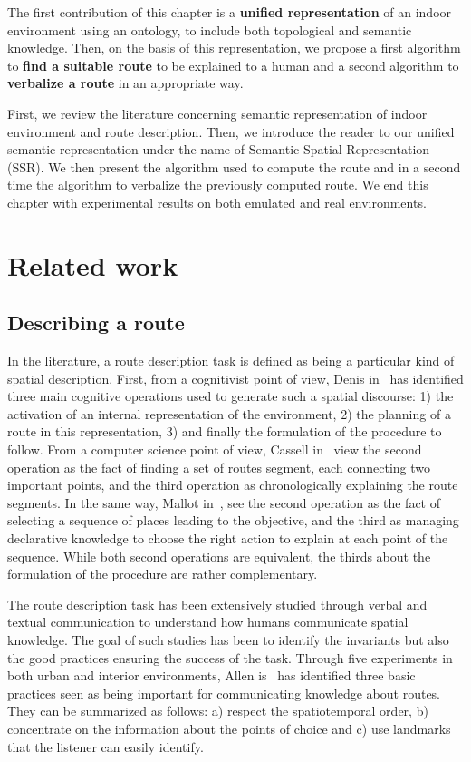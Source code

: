 The first contribution of this chapter is a \textbf{unified representation} of an indoor environment using an ontology, to include both topological and semantic knowledge. Then, on the basis of this representation, we propose a first algorithm to \textbf{find a suitable route} to be explained to a human and a second algorithm to \textbf{verbalize a route} in an appropriate way.

First, we review the literature concerning semantic representation of indoor environment and route description. Then, we introduce the reader to our unified semantic representation under the name of Semantic Spatial Representation (SSR). We then present the algorithm used to compute the route and in a second time the algorithm to verbalize the previously computed route. We end this chapter with experimental results on both emulated and real environments.

\section{Related work}

\subsection{Describing a route}

In the literature, a route description task is defined as being a particular kind of spatial description. First, from a cognitivist point of view, Denis in~\cite{denis_1997_description} has identified three main cognitive operations used to generate such a spatial discourse: 1) the activation of an internal representation of the environment, 2) the planning of a route in this representation, 3) and finally the formulation of the procedure to follow. From a computer science point of view, Cassell in~\cite{cassell_2007_trading} view the second operation as the fact of finding a set of routes segment, each connecting two important points, and the third operation as chronologically explaining the route segments. In the same way, Mallot in~\cite{mallot_2009_embodied}, see the second operation as the fact of selecting a sequence of places leading to the objective, and the third as managing declarative knowledge to choose the right action to explain at each point of the sequence. While both second operations are equivalent, the thirds about the formulation of the procedure are rather complementary.

The route description task has been extensively studied through verbal and textual communication to understand how humans communicate spatial knowledge. The goal of such studies has been to identify the invariants but also the good practices ensuring the success of the task. Through five experiments in both urban and interior environments, Allen is~\cite{allen_2000_principles} has identified three basic practices seen as being important for communicating knowledge about routes. They can be summarized as follows: a) respect the spatiotemporal order, b) concentrate on the information about the points of choice and c) use landmarks that the listener can easily identify.

